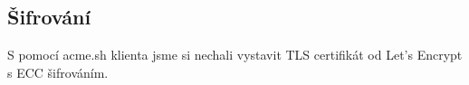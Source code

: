 \subsection{Šifrování}
S pomocí acme.sh klienta jsme si nechali vystavit TLS certifikát od Let's Encrypt s ECC šifrováním.